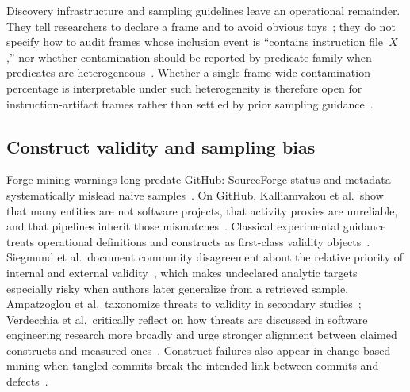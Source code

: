 Discovery infrastructure and sampling guidelines leave an operational remainder.
They tell researchers to declare a frame and to avoid obvious toys~\cite{dabic2021sampling,baltes2022sampling}; they do not specify how to audit frames whose inclusion event is ``contains instruction file~$X$,'' nor whether contamination should be reported by predicate family when predicates are heterogeneous~\cite{baltes2022sampling,chen2025promptware}.
Whether a single frame-wide contamination percentage is interpretable under such heterogeneity is therefore open for instruction-artifact frames rather than settled by prior sampling guidance~\cite{dabic2021sampling,baltes2022sampling}.

\subsection{Construct validity and sampling bias}
\label{subsec:rw-validity}

Forge mining warnings long predate GitHub: SourceForge status and metadata systematically mislead naive samples~\cite{howison2004perils}.
On GitHub, Kalliamvakou et al.\ show that many entities are not software projects, that activity proxies are unreliable, and that pipelines inherit those mismatches~\cite{kalliamvakou2015indepth}.
Classical experimental guidance treats operational definitions and constructs as first-class validity objects~\cite{wohlin2012,runeson2009}.
Siegmund et al.\ document community disagreement about the relative priority of internal and external validity~\cite{siegmund2015views}, which makes undeclared analytic targets especially risky when authors later generalize from a retrieved sample.
Ampatzoglou et al.\ taxonomize threats to validity in secondary studies~\cite{ampatzoglou2019threats}; Verdecchia et al.\ critically reflect on how threats are discussed in software engineering research more broadly and urge stronger alignment between claimed constructs and measured ones~\cite{verdecchia2023threats}.
Construct failures also appear in change-based mining when tangled commits break the intended link between commits and defects~\cite{herzig2013tangled}.

